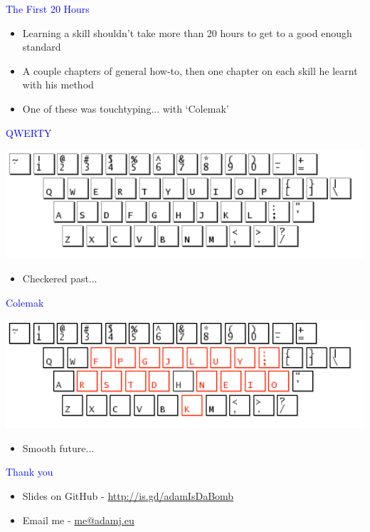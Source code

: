 \documentclass[landscape]{slides}
\begin{document}
\begin{slide}

    \textcolor{blue}{\Large{The First 20 Hours}}

    \begin{itemize}
        \item Learning a skill shouldn't take more than 20 hours to get to a good enough standard
        \item A couple chapters of general how-to, then one chapter on each skill he learnt with his method
        \item One of these was touchtyping... with `Colemak'
    \end{itemize}

\end{slide}


\begin{slide}

    \textcolor{blue}{\Large{QWERTY}}

    \centering
    \includegraphics[width=20cm]{qwerty}

    \begin{itemize}
        \item Checkered past...
    \end{itemize}

\end{slide}


\begin{slide}

    \textcolor{blue}{\Large{Colemak}}

    \centering
    \includegraphics[width=20cm]{colemak-annot}

    \begin{itemize}
        \item Smooth future...
    \end{itemize}

\end{slide}


\begin{slide}
    \textcolor{blue}{\Large{Thank you}}

    \begin{itemize}
        \item Slides on GitHub - \url{http://is.gd/adamIsDaBomb}
        \item Email me - \url{me@adamj.eu}
    \end{itemize}

\end{slide}
\end{document}
